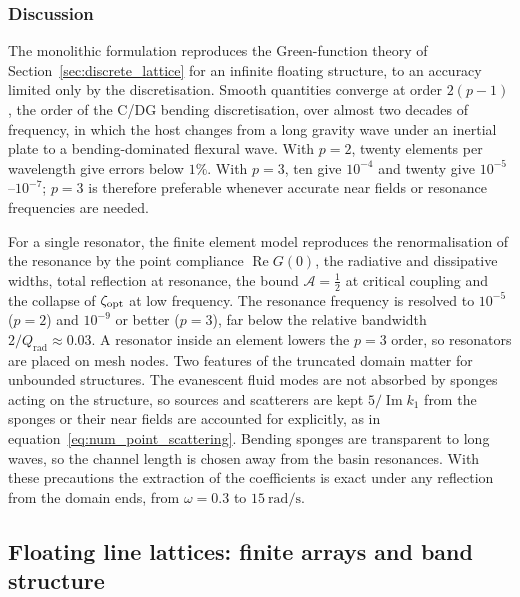 {\subsubsection{Discussion}\label{subsubsec:num_discussion_A}

The monolithic formulation reproduces the Green-function theory of Section~\ref{sec:discrete_lattice} for an infinite floating structure, to an accuracy limited only by the discretisation. Smooth quantities converge at order $2(p-1)$, the order of the C/DG bending discretisation, over almost two decades of frequency, in which the host changes from a long gravity wave under an inertial plate to a bending-dominated flexural wave. With $p=2$, twenty elements per wavelength give errors below $1\%$. With $p=3$, ten give $10^{-4}$ and twenty give $10^{-5}$--$10^{-7}$; $p=3$ is therefore preferable whenever accurate near fields or resonance frequencies are needed.

For a single resonator, the finite element model reproduces the renormalisation of the resonance by the point compliance $\operatorname{Re}G(0)$, the radiative and dissipative widths, total reflection at resonance, the bound $\mathcal{A}=\tfrac12$ at critical coupling and the collapse of $\zeta_{\rm opt}$ at low frequency. The resonance frequency is resolved to $10^{-5}$ ($p=2$) and $10^{-9}$ or better ($p=3$), far below the relative bandwidth $2/Q_\mathrm{rad}\approx0.03$. A resonator inside an element lowers the $p=3$ order, so resonators are placed on mesh nodes. Two features of the truncated domain matter for unbounded structures. The evanescent fluid modes are not absorbed by sponges acting on the structure, so sources and scatterers are kept $5/\operatorname{Im}k_1$ from the sponges or their near fields are accounted for explicitly, as in equation~\eqref{eq:num_point_scattering}. Bending sponges are transparent to long waves, so the channel length is chosen away from the basin resonances. With these precautions the extraction of the coefficients is exact under any reflection from the domain ends, from $\omega=0.3$ to $15~\si{\radian\per\second}$.

\subsection{Floating line lattices: finite arrays and band structure}\label{subsec:num_lattices}

}
